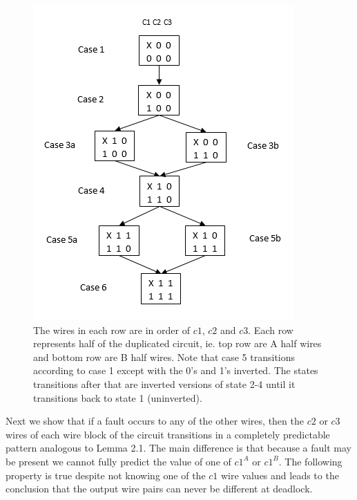 \documentclass[12pt]{report}
\begin{document}
\begin{figure}
  \centering
    \includegraphics{flowl4c3v2}
  \caption{The wires in each row are in order of $c1$, $c2$ and $c3$.  Each row represents half of the duplicated circuit, ie. top row are A half wires and bottom row are B half wires.  Note that case 5 transitions according to case 1 except with the 0's and 1's inverted.  The states transitions after that are inverted versions of state 2-4 until it transitions back to state 1 (uninverted).}
  \label{fig:l4}
\end{figure}
Next we show that if a fault occurs to any of the other wires, then the $c2$ or $c3$ wires of each wire block of the circuit transitions in a completely predictable pattern analogous to Lemma 2.1.  The main difference is that because a fault may be present we cannot fully predict the value of one of $c1^A$ or $c1^B$.  The following property is true despite not knowing one of the $c1$ wire values and leads to the conclusion that the output wire pairs can never be different at deadlock.  
\end{document}
